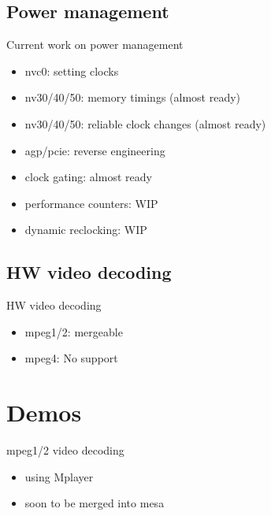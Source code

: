 \documentclass[11pt,english,compress]{beamer}
\begin{document}
	\subsection{Power management}
		\begin{frame}
			\begin{block}{Current work on power management}
				\begin{itemize}
					\item nvc0: setting clocks
					\item nv30/40/50: memory timings (almost ready)
					\item nv30/40/50: reliable clock changes (almost ready)
					\item agp/pcie: reverse engineering
					\item clock gating: almost ready
					\item performance counters: WIP
					\item dynamic reclocking: WIP
				\end{itemize}
			\end{block}
		\end{frame}

	\subsection{HW video decoding}
		\begin{frame}
			\begin{block}{HW video decoding}
				\begin{itemize}
					\item mpeg1/2: mergeable
					\item mpeg4: No support
				\end{itemize}
			\end{block}
		\end{frame}

\section{Demos}
	\begin{frame}
		\begin{block}{mpeg1/2 video decoding}
			\begin{itemize}
				\item using Mplayer
				\item soon to be merged into mesa
			\end{itemize}
		\end{block}
	\end{frame}
\end{document}
